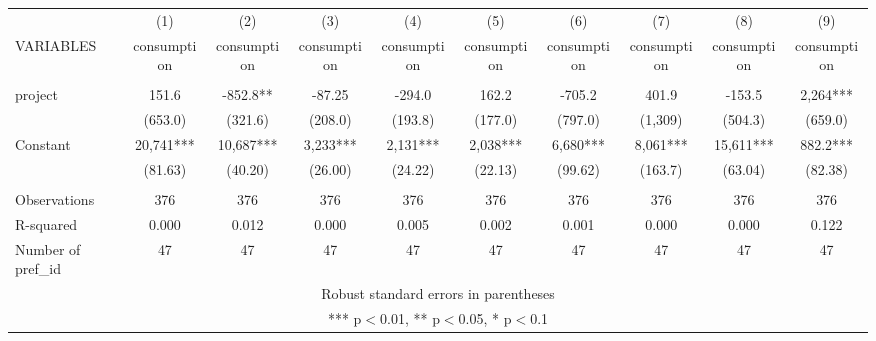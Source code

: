 \documentclass[]{article}
\begin{document}
\begin{tabular}{lccccccccc} \hline
 & (1) & (2) & (3) & (4) & (5) & (6) & (7) & (8) & (9) \\
VARIABLES & consumption & consumption & consumption & consumption & consumption & consumption & consumption & consumption & consumption \\ \hline
 &  &  &  &  &  &  &  &  &  \\
project & 151.6 & -852.8** & -87.25 & -294.0 & 162.2 & -705.2 & 401.9 & -153.5 & 2,264*** \\
 & (653.0) & (321.6) & (208.0) & (193.8) & (177.0) & (797.0) & (1,309) & (504.3) & (659.0) \\
Constant & 20,741*** & 10,687*** & 3,233*** & 2,131*** & 2,038*** & 6,680*** & 8,061*** & 15,611*** & 882.2*** \\
 & (81.63) & (40.20) & (26.00) & (24.22) & (22.13) & (99.62) & (163.7) & (63.04) & (82.38) \\
 &  &  &  &  &  &  &  &  &  \\
Observations & 376 & 376 & 376 & 376 & 376 & 376 & 376 & 376 & 376 \\
R-squared & 0.000 & 0.012 & 0.000 & 0.005 & 0.002 & 0.001 & 0.000 & 0.000 & 0.122 \\
 Number of pref\_id & 47 & 47 & 47 & 47 & 47 & 47 & 47 & 47 & 47 \\ \hline
\multicolumn{10}{c}{ Robust standard errors in parentheses} \\
\multicolumn{10}{c}{ *** p$<$0.01, ** p$<$0.05, * p$<$0.1} \\
\end{tabular}
\end{document}
